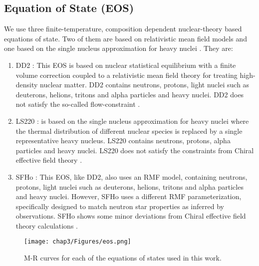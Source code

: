 \subsection{Equation of State (EOS)}

We use three finite-temperature, composition dependent nuclear-theory based equations of state. Two of them are based on relativistic mean field models \cite{walecka1974theory} and one based on the single nucleus approximation for heavy nuclei \cite{lattimer1991generalized}. They are:

\begin{enumerate}
\item{DD2 \cite{hempel:2011mk}: This EOS is based on nuclear statistical equilibrium with a finite volume correction coupled to a relativistic mean field theory for treating high-density nuclear matter. DD2 contains neutrons, protons, light nuclei such as deuterons, helions, tritons and alpha particles and heavy nuclei. DD2 does not satisfy the so-called flow-constraint \cite{hempel2017well}.}
\item{
LS220 \cite{lattimer1991generalized}: is based on the single nucleus approximation
for heavy nuclei where the thermal distribution of different nuclear species is replaced by a single representative heavy nucleus. LS220 contains  neutrons, protons, alpha particles and heavy nuclei. LS220 does not satisfy the constraints from Chiral effective field theory \cite{hempel2017well}.
}
\item{SFHo \cite{2013apj...765l...5s}: This EOS, like DD2, also uses an RMF model, containing neutrons, protons, light nuclei such as deuterons, helions, tritons and alpha particles and heavy nuclei. However, SFHo uses a different RMF parameterization,
specifically designed to match neutron star properties as inferred by observations. SFHo shows some minor
deviations from Chiral effective field theory calculations \cite{hempel2017well}.
}
\end{enumerate}

\begin{figure}
  \texttt{[image: chap3/Figures/eos.png]}
\caption{
  M-R curves for each of the equations of states used in this work.
}
\label{fig:eos_mr}
\end{figure}

